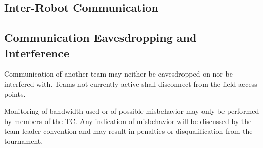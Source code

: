 \documentclass[12pt,twoside]{article}
\begin{document}
\subsection{Inter-Robot Communication}
\label{sec:inter-robot-comm}

\subsection{Communication Eavesdropping and Interference}
\label{sec:comm-tampering}
Communication of another team may neither be eavesdropped on nor be
interfered with. Teams not currently active shall disconnect from the
field access points.

Monitoring of bandwidth used or of possible misbehavior may only be
performed by members of the TC.
Any indication of misbehavior will be discussed by the team leader
convention and may result in penalties or disqualification from the
tournament.


\end{document}
